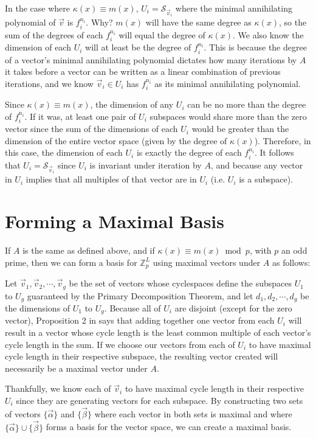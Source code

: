 \documentclass[a4paper, reqno, 12pt]{amsart}
\newcommand\cycsp[1]{\mathcal{S}_{#1}}
\begin{document}
		In the case where $\kappa(x) \equiv m(x)$, $U_i = \cycsp{\vec{v}_i}$ where the minimal annihilating polynomial of $\vec{v}$ is $f_i^{n_i}$. Why?
		$m(x)$ will have the same degree as $\kappa(x)$, so the sum of the degrees of each $f_i^{n_i}$ will equal the degree of $\kappa(x)$. We also know the 
		dimension of each $U_i$ will at least be the degree of $f_i^{n_i}$. This is because the degree of a vector's minimal annihilating polynomial dictates how many 
		iterations by $A$ it takes before a vector can be written as a linear combination of previous iterations, and we know $\vec{v}_i \in U_i$ has $f_i^{n_i}$ as 
		its minimal annihilating polynomial.
		
		Since $\kappa(x) \equiv m(x)$, the dimension of any $U_i$ can be no more than the degree of $f_i^{n_i}$. If it was, at least one pair of $U_i$ subspaces
		would share more than the zero vector since the sum of the dimensions of each $U_i$ would be greater than the dimension of the entire vector space (given 
		by the degree of $\kappa(x)$). Therefore, in this case, the dimension of each $U_i$ is exactly the degree of each $f_i^{n_i}$. It follows that 
		$U_i = \cycsp{\vec{v}_i}$ since $U_i$ is invariant under iteration by $A$, and because any vector in $U_i$ implies that all multiples of that vector are 
		in $U_i$ (i.e. $U_i$ is a subspace).
		
	\section{Forming a Maximal Basis}
		If $A$ is the same as defined above, and if $\kappa(x) \equiv m(x) \bmod{p}$, with $p$ an odd prime, then we can form a basis for $\mathds{Z}_{p}^{L}$ using 
		maximal vectors under $A$ as follows:
		
		Let $\vec{v}_1, \vec{v}_2, \cdots, \vec{v}_g$ be the set of vectors whose cyclespaces define the subspaces $U_1$ to $U_g$ guaranteed by the Primary
		Decomposition Theorem, and let $d_1, d_2, \cdots, d_g$ be the dimensions of $U_1$ to $U_g$. Because all of $U_i$ are disjoint (except for the zero vector),
		Proposition 2 in \citet{Mendivil2012} says that adding together one vector from each $U_i$ will result in a vector whose cycle length is the least common
		multiple of each vector's cycle length in the sum. If we choose our vectors from each of $U_i$ to have maximal cycle length in their respective subspace,
		the resulting vector created will necessarily be a maximal vector under $A$.
		
		Thankfully, we know each of $\vec{v}_i$ to have maximal cycle length in their respective $U_i$ since they are generating vectors for each subspace.
		By constructing two sets of vectors $\{\vec{\alpha}\}$ and $\{\vec{\beta}\}$ where each vector in both sets is maximal and where 
		$\{\vec{\alpha}\} \cup \{\vec{\beta}\}$ forms a basis for the vector space, we can create a maximal basis.
		
\end{document}
